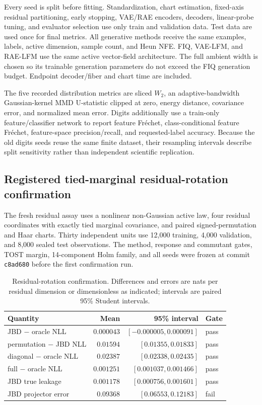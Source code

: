 Every seed is split before fitting.  Standardization, chart estimation, fixed-axis residual partitioning, early stopping, VAE/RAE encoders, decoders, linear-probe tuning, and evaluator selection use only train and validation data.  Test data are used once for final metrics.  All generative methods receive the same examples, labels, active dimension, sample count, and Heun NFE.  FIQ, VAE-LFM, and RAE-LFM use the same active vector-field architecture.  The full ambient width is chosen so its trainable generation parameters do not exceed the FIQ generation budget.  Endpoint decoder/fiber and chart time are included.

The five recorded distribution metrics are sliced $W_2$, an adaptive-bandwidth Gaussian-kernel MMD U-statistic clipped at zero, energy distance, covariance error, and normalized mean error.  Digits additionally use a train-only feature/classifier network to report feature Fr\'echet, class-conditional feature Fr\'echet, feature-space precision/recall, and requested-label accuracy.  Because the old digits seeds reuse the same finite dataset, their resampling intervals describe split sensitivity rather than independent scientific replication.

\clearpage
\subsection{Registered tied-marginal residual-rotation confirmation}

The fresh residual assay uses a nonlinear non-Gaussian active law, four residual coordinates with exactly tied marginal covariance, and paired signed-permutation and Haar charts.  Thirty independent units use 12,000 training, 4,000 validation, and 8,000 sealed test observations.  The method, response and commutant gates, TOST margin, 14-component Holm family, and all seeds were frozen at commit \texttt{c8ad680} before the first confirmation run.

\begin{table}[h]
\centering
\small
\caption{Residual-rotation confirmation. Differences and errors are nats per residual dimension or dimensionless as indicated; intervals are paired 95\% Student intervals.}
\begin{tabular}{lrrl}
\toprule
Quantity & Mean & 95\% interval & Gate\\
\midrule
JBD $-$ oracle NLL & $0.000043$ & $[-0.000005,0.000091]$ & pass\\
permutation $-$ JBD NLL & $0.01594$ & $[0.01355,0.01833]$ & pass\\
diagonal $-$ oracle NLL & $0.02387$ & $[0.02338,0.02435]$ & pass\\
full $-$ oracle NLL & $0.001251$ & $[0.001037,0.001466]$ & pass\\
JBD true leakage & $0.001178$ & $[0.000756,0.001601]$ & pass\\
JBD projector error & $0.09368$ & $[0.06553,0.12183]$ & fail\\
\bottomrule
\end{tabular}
\label{tab:rotation-confirmation}
\end{table}

